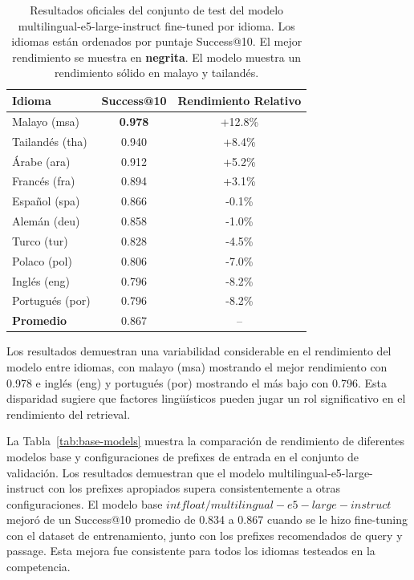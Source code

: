 \documentclass[11pt]{article}
\begin{document}
\begin{table}[t]
  \centering
  \small
  \begin{tabular}{lcc}
    \hline
    \textbf{Idioma} & \textbf{Success@10} & \textbf{Rendimiento Relativo} \\
    \hline
    Malayo (msa) & \textbf{0.978} & +12.8\% \\
    Tailandés (tha) & 0.940 & +8.4\% \\
    Árabe (ara) & 0.912 & +5.2\% \\
    Francés (fra) & 0.894 & +3.1\% \\
    Español (spa) & 0.866 & -0.1\% \\
    Alemán (deu) & 0.858 & -1.0\% \\
    Turco (tur) & 0.828 & -4.5\% \\
    Polaco (pol) & 0.806 & -7.0\% \\
    Inglés (eng) & 0.796 & -8.2\% \\
    Portugués (por) & 0.796 & -8.2\% \\
    \hline
    \textbf{Promedio} & 0.867 & -- \\
    \hline
  \end{tabular}
  \caption{Resultados oficiales del conjunto de test del modelo multilingual-e5-large-instruct fine-tuned por idioma. Los idiomas están ordenados por puntaje Success@10. El mejor rendimiento se muestra en \textbf{negrita}. El modelo muestra un rendimiento sólido en malayo y tailandés.}
  \label{tab:test-results-by-language}
\end{table}

Los resultados demuestran una variabilidad considerable en el rendimiento del modelo entre idiomas, con malayo (msa) mostrando el mejor rendimiento con 0.978 e inglés (eng) y portugués (por) mostrando el más bajo con 0.796. Esta disparidad sugiere que factores lingüísticos pueden jugar un rol significativo en el rendimiento del retrieval.

La Tabla~\ref{tab:base-models} muestra la comparación de rendimiento de diferentes modelos base y configuraciones de prefixes de entrada en el conjunto de validación. Los resultados demuestran que el modelo multilingual-e5-large-instruct con los prefixes apropiados supera consistentemente a otras configuraciones.
El modelo base $intfloat/multilingual-e5-large-
instruct$ \cite{wang2024multilingual} mejoró de un
Success@10 promedio de 0.834 a 0.867 cuando se le hizo
fine-tuning con el dataset de entrenamiento, junto con los
prefixes recomendados de query y passage. Esta mejora
fue consistente para todos los idiomas testeados
en la competencia.
\end{document}

